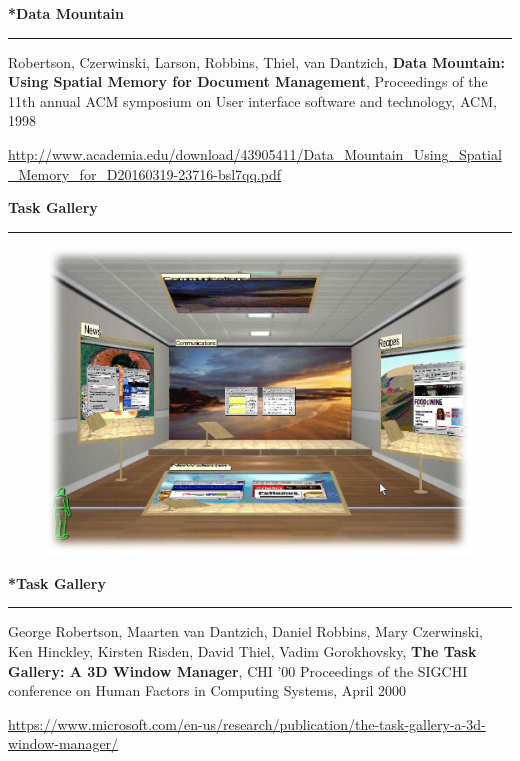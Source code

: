 \documentclass[pdf]{beamer}
\begin{document}
\begin{frame}
{\textbf{*Data Mountain}}{\textcolor{red}{\rule{12cm}{1.2pt}}}

Robertson, Czerwinski, Larson, Robbins, Thiel, van Dantzich, \textbf{Data Mountain: Using Spatial Memory for Document Management}, Proceedings of the 11th annual ACM symposium on User interface software and technology, ACM, 1998
\newline

\url{http://www.academia.edu/download/43905411/Data_Mountain_Using_Spatial_Memory_for_D20160319-23716-bsl7qq.pdf}

\end{frame}



\begin{frame}
{\textbf{Task Gallery}}{\textcolor{red}{\rule{12cm}{1.2pt}}}

\begin{figure}
\centering
\includegraphics[scale=0.45]{42_Picture1.png}
\end{figure}

\end{frame}



\begin{frame}
{\textbf{*Task Gallery}}{\textcolor{red}{\rule{12cm}{1.2pt}}}

George Robertson, Maarten van Dantzich, Daniel Robbins, Mary Czerwinski, Ken Hinckley, Kirsten Risden, David Thiel, Vadim Gorokhovsky, \textbf{The Task Gallery: A 3D Window Manager}, CHI '00 Proceedings of the SIGCHI conference on Human Factors in Computing Systems, April 2000
\newline

\url{https://www.microsoft.com/en-us/research/publication/the-task-gallery-a-3d-window-manager/}
\end{frame}
\end{document}
